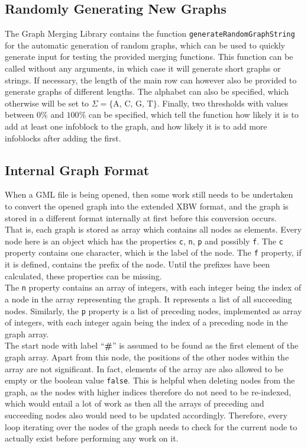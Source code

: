 \documentclass[a4paper,12pt,twoside,BCOR=10mm]{scrbook}
\begin{document}
\subsection{Randomly Generating New Graphs}

The Graph Merging Library contains the function \texttt{generateRandomGraphString} for 
the automatic generation of random graphs, which can be used to quickly generate input for testing the 
provided merging functions. 
This function can be called without any arguments, in which case it will generate short graphs 
or strings. If necessary, the length of the main row can however also be provided to generate 
graphs of different lengths. The alphabet can also be specified, which otherwise will be 
set to $ \Sigma = \{ \textrm{A, C, G, T} \} $. Finally, two thresholds with values between $ 0\% $ and $ 100\% $ can 
be specified, which tell the function how likely it is to add at least one infoblock to the graph, 
and how likely it is to add more infoblocks after adding the first.


\subsection{Internal Graph Format}
\label{sec:internal_graph_format}

When a GML file is being opened, then some work still needs to be undertaken 
to convert the opened graph into the extended XBW format, and the graph is stored 
in a different format internally at first before this conversion occurs. \\
That is, each graph is stored as array which contains all nodes as elements. 
Every node here is an object which has the properties \texttt{c}, \texttt{n}, \texttt{p} and 
possibly \texttt{f}. The \texttt{c} property contains one character, which is the label of the node. 
The \texttt{f} property, if it is defined, contains the prefix of the node. Until the prefixes have 
been calculated, these properties can be missing. \\
The \texttt{n} property contains an array of integers, with each integer being the index 
of a node in the array representing the graph. It represents a list of all succeeding nodes. 
Similarly, the \texttt{p} property is a list of preceding nodes, implemented as array of integers, 
with each integer again being the index of a preceding node in the graph array. \\
The start node with label “\textbf{\#}” is assumed to be found as the first element 
of the graph array. Apart from this node, the positions of the other nodes within 
the array are not significant. In fact, elements of the array are also allowed to 
be empty or the boolean value \texttt{false}. This is helpful when deleting 
nodes from the graph, as the nodes with higher indices therefore do not need to be re-indexed, 
which would entail a lot of work as then all the arrays of preceding and succeeding nodes 
also would need to be updated accordingly. 
Therefore, every loop iterating over the nodes of the graph needs to check for the 
current node to actually exist before performing any work on it.
\end{document}
